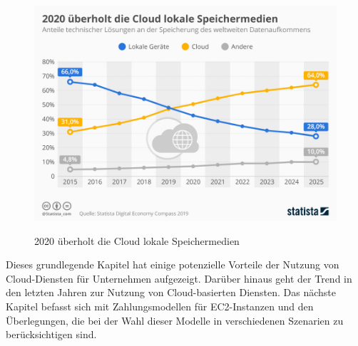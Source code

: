 \begin{figure}[h!]
      \centering
      \includegraphics[scale=0.4]{sources/moreCloudStorageThanLocal}
      \caption[2020 überholt die Cloud lokale Speichermedien]{}\label{fig:moreCloudStorageThanLocal}
      2020 überholt die Cloud lokale Speichermedien
            {\cite{STA1}}
\end{figure}

Dieses grundlegende Kapitel hat einige potenzielle Vorteile der Nutzung von Cloud-Diensten für Unternehmen aufgezeigt. Darüber hinaus geht der Trend in den letzten Jahren zur Nutzung von Cloud-basierten Diensten. Das nächste Kapitel befasst sich mit Zahlungsmodellen für EC2-Instanzen und den Überlegungen, die bei der Wahl dieser Modelle in verschiedenen Szenarien zu berücksichtigen sind.
\newpage


